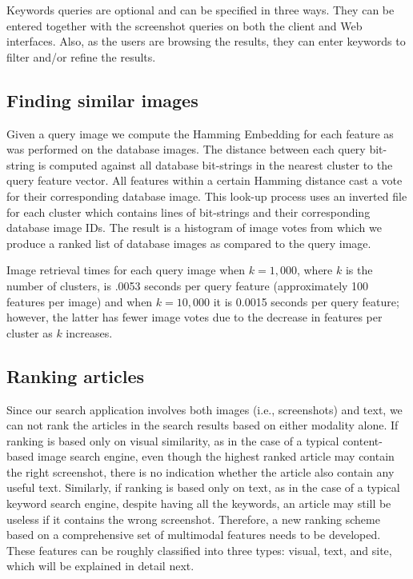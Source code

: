 \documentclass{www2010-submission}
\begin{document}
Keywords queries are optional and can be specified in three ways.
They can be entered together with the screenshot queries on both
the client and Web interfaces. Also, as the users are browsing the
results, they can enter keywords to filter and/or refine the
results.

\subsection{Finding similar images}
Given a query image we
compute the Hamming Embedding for each feature as was performed on the
database images.  The distance between each query bit-string is
computed against all database bit-strings in the nearest cluster to
the query feature vector.  All features within a certain Hamming
distance cast a vote for their corresponding database image.  This
look-up process uses an inverted file for each cluster which contains
lines of bit-strings and their corresponding database image IDs.  The
result is a histogram of image votes from which we produce a ranked list of
database images as compared to the query image.

Image retrieval times for each query image when $k=1,000$, where $k$ is the number of clusters, is .0053 seconds per query feature (approximately 100 features per image) and when $k=10,000$ it is 0.0015 seconds per query feature; however, the latter has fewer image votes due to the decrease in features per cluster as $k$ increases.


\subsection{Ranking articles}

Since our search application involves both images (i.e., screenshots)
and text, we can not rank the articles in the search results based on
either modality alone. If ranking is based only on visual similarity,
as in the case of a typical content-based image search engine, even
though the highest ranked article may contain the right screenshot,
there is no indication whether the article also contain any useful
text. Similarly, if ranking is based only on text, as in the case of a
typical keyword search engine, despite having all the keywords, an
article may still be useless if it contains the wrong
screenshot. Therefore, a new ranking scheme based on a comprehensive
set of multimodal features needs to be developed. These features can
be roughly classified into three types: visual, text, and site,
which will be explained in detail next.
\end{document}
